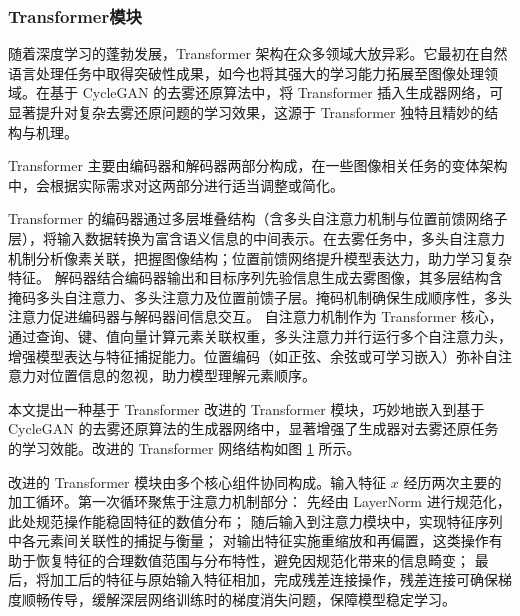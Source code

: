 \subsubsection{Transformer模块}

随着深度学习的蓬勃发展，Transformer 架构在众多领域大放异彩。它最初在自然语言处理任务中取得突破性成果，如今也将其强大的学习能力拓展至图像处理领域。在基于 CycleGAN 的去雾还原算法中，将 Transformer 插入生成器网络，可显著提升对复杂去雾还原问题的学习效果，这源于 Transformer 独特且精妙的结构与机理。

Transformer 主要由编码器和解码器两部分构成，在一些图像相关任务的变体架构中，会根据实际需求对这两部分进行适当调整或简化。


Transformer 的编码器通过多层堆叠结构（含多头自注意力机制与位置前馈网络子层），将输入数据转换为富含语义信息的中间表示。在去雾任务中，多头自注意力机制分析像素关联，把握图像结构；位置前馈网络提升模型表达力，助力学习复杂特征。
解码器结合编码器输出和目标序列先验信息生成去雾图像，其多层结构含掩码多头自注意力、多头注意力及位置前馈子层。掩码机制确保生成顺序性，多头注意力促进编码器与解码器间信息交互。
自注意力机制作为 Transformer 核心，通过查询、键、值向量计算元素关联权重，多头注意力并行运行多个自注意力头，增强模型表达与特征捕捉能力。位置编码（如正弦、余弦或可学习嵌入）弥补自注意力对位置信息的忽视，助力模型理解元素顺序。

本文提出一种基于 Transformer 改进的 Transformer 模块，巧妙地嵌入到基于 CycleGAN 的去雾还原算法的生成器网络中，显著增强了生成器对去雾还原任务的学习效能。改进的 Transformer 网络结构如图 \ref{fig:transformer} 所示。

\begin{figure}[htb]
    \centering
    \captionsetup{font=footnotesize}
    \label{fig:transformer}
\end{figure}

改进的 Transformer 模块由多个核心组件协同构成。输入特征 $x$ 经历两次主要的加工循环。第一次循环聚焦于注意力机制部分：
先经由 LayerNorm 进行规范化，此处规范操作能稳固特征的数值分布；
随后输入到注意力模块中，实现特征序列中各元素间关联性的捕捉与衡量；
对输出特征实施重缩放和再偏置，这类操作有助于恢复特征的合理数值范围与分布特性，避免因规范化带来的信息畸变；
最后，将加工后的特征与原始输入特征相加，完成残差连接操作，残差连接可确保梯度顺畅传导，缓解深层网络训练时的梯度消失问题，保障模型稳定学习。

